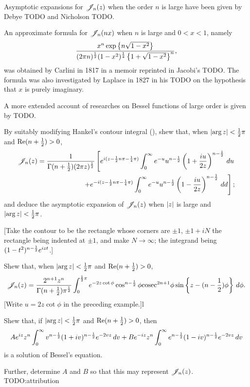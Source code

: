 \documentclass{book}
\begin{document}
  Asymptotic expansions for $\mathscr{J}_n(z)$ when the order $n$ is large have
  been given by Debye TODO and Nicholson TODO.

  An approximate formula for $\mathscr{J}_n(nx)$ when $n$ is large and $0<x<1$,
  namely
  $$
  \frac{ x^n \exp\left\{ n \sqrt{1-x^2} \right\}}{ (2\pi n)^{\frac{1}{2}} (1-x^2)^{\frac{1}{4}} \left\{ 1 +
      \sqrt{1 - x^2} \right\}^n},
  $$
  was obtained by Carlini in 1817 in a memoir reprinted in Jacobi's
  TODO.
  The formula was also investigated by Laplace in 1827 in his TODO on
  the hypothesis that $x$ is purely imaginary.

  A more extended account of researches on Bessel functions of large
  order is given by TODO.
  \begin{wandwexample}
    By suitably modifying Hankel's contour integral
    (), shew that, when
    $\left| \arg z \right| < \frac{1}{2} \pi$ and
    $\mathrm{Re}(n+\frac{1}{2}) > 0$,
    \begin{align*}
      \mathscr{J}_n(z)
      =
      \frac{1}{\Gamma(n+\frac{1}{2}) (2\pi z)^{\frac{1}{2}}}
      \left[
        e^{i(z - \frac{1}{2} n \pi - \frac{1}{4} \pi)}
        \int_0^{\infty}
        e^{-u}
        u^{n-\frac{1}{2}}
        \left( 1 + \frac{iu}{2z} \right)^{n-\frac{1}{2}}
        \, d u
      \right.
      \\
      \left.
        +
        e^{-i(z - \frac{1}{2} n \pi - \frac{1}{4}\pi)}
        \int_0^{\infty}
        e^{-u}
        u^{n-\frac{1}{2}}
        \left( 1 - \frac{iu}{2z} \right)^{n-\frac{1}{2}}
        \, d d
        \right];
      \end{align*}
      and deduce the asymptotic expansion of $\mathscr{J}_n(z)$ when
      $\left| z \right|$ is large and
      $\left| \arg z \right| < \frac{1}{2} \pi$.

      [Take the contour to be the rectangle whose corners are
      $\pm 1$, $\pm 1 + iN$ the rectangle being indented at $\pm 1$,
      and make $N \rightarrow \infty$; the integrand being
      $(1-t^2)^{n-\frac{1}{2}} e^{izt}$.]
    \end{wandwexample}
    \begin{wandwexample}
      Shew that, when $\left| \arg z \right| < \frac{1}{2} \pi$ and
      $\mathrm{Re}(n+\frac{1}{2}) > 0$,
      $$
      \mathscr{J}_n(z)
      =
      \frac{2^{n+1} z^n}{\Gamma(n+\frac{1}{2}) \pi^{\frac{1}{2}}}
      \int_0^{\frac{1}{2}\pi}
      e^{-2z\cot\phi}
      \cos^{n-\frac{1}{2}}\phi
      \mathrm{cosec}^{2n+1}\phi
      \sin\left\{ z - (n-\frac{1}{2})\phi \right\}
      \, d \phi.
      $$
      [Write $u = 2z\cot\phi$ in the preceding example.]l
    \end{wandwexample}
    \begin{wandwexample}
      Shew that, if $\left| \arg z \right| < \frac{1}{2} \pi$ and
      $\mathrm{Re}(n+\frac{1}{2}) > 0$, then
      $$
      A e^{iz} z^n
      \int_0^{\infty}
      v^{n-\frac{1}{2}}
      (1+iv)^{n-\frac{1}{2}}
      e^{-2vz}
      \, d v
      +
      B e^{-iz} z^n
      \int_0^{\infty}
      e^{n-\frac{1}{2}}
      (1-iv)^{n-\frac{1}{2}}
      e^{-2vz}
      \, d v
      $$
      is a solution of Bessel's equation.

      Further, determine $A$ and $B$ so that this may represent
      $\mathscr{J}_n(z)$.
      TODO:attribution
    \end{wandwexample}
\end{document}
